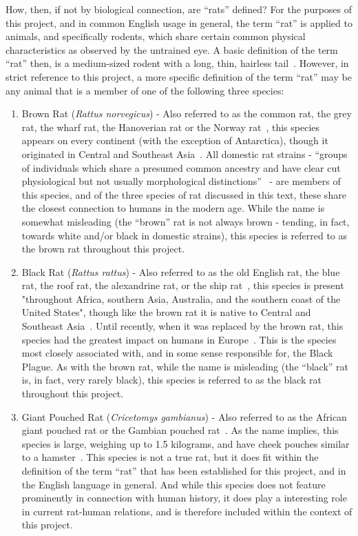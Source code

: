 \documentclass[12pt]{article}
\begin{document}
How, then, if not by biological connection, are ``rats'' defined? For the purposes of this project, and in common English usage in general, the term ``rat'' is applied to animals, and specifically rodents, which share certain common physical characteristics as observed by the untrained eye. A basic definition of the term ``rat'' then, is a medium-sized rodent with a long, thin, hairless tail~\cite{Hanson2012}. However, in strict reference to this project, a more specific definition of the term ``rat'' may be any animal that is a member of one of the following three species:
\begin{enumerate}
\item Brown Rat (\textit{Rattus norvegicus}) - Also referred to as the common rat, the grey rat, the wharf rat, the Hanoverian rat or the Norway rat~\cite{Barnett1975, Barnett2001}, this species appears on every continent (with the exception of Antarctica), though it originated in Central and Southeast Asia~\cite{ONeill}. All domestic rat strains - ``groups of individuals which share a presumed common ancestry and have clear cut physiological but not usually morphological distinctions''~\cite{Hanson2012} - are members of this species, and of the three species of rat discussed in this text, these share the closest connection to humans in the modern age. While the name is somewhat misleading (the ``brown'' rat is not always brown - tending, in fact, towards white and/or black in domestic strains), this species is referred to as the brown rat throughout this project.
\item Black Rat (\textit{Rattus rattus}) - Also referred to as the old English rat, the blue rat, the roof rat, the alexandrine rat, or the ship rat~\cite{Barnett1975, Barnett2001}, this species is present "throughout Africa, southern Asia, Australia, and the southern coast of the United States", though like the brown rat it is native to Central and Southeast Asia~\cite{ONeill, Zelnio2011}. Until recently, when it was replaced by the brown rat, this species had the greatest impact on humans in Europe~\cite{Barnett2001}. This is the species most closely associated with, and in some sense responsible for, the Black Plague. As with the brown rat, while the name is misleading (the ``black'' rat is, in fact, very rarely black), this species is referred to as the black rat throughout this project.
\item Giant Pouched Rat (\textit{Cricetomys gambianus}) - Also referred to as the African giant pouched rat or the Gambian pouched rat~\cite{APOPO}. As the name implies, this species is large, weighing up to 1.5 kilograms, and have cheek pouches similar to a hamster~\cite{APOPO}. This species is not a true rat, but it does fit within the definition of the term ``rat'' that has been established for this project, and in the English language in general. And while this species does not feature prominently in connection with human history, it does play a interesting role in current rat-human relations, and is therefore included within the context of this project.
\end{enumerate}
\end{document}
